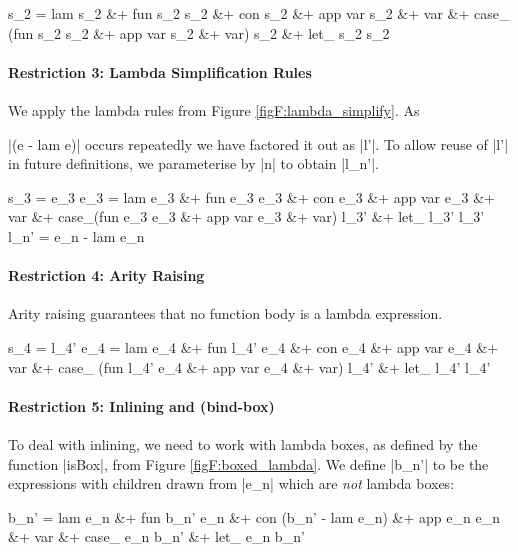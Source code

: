 \ignore\begin{code}
s_2  =  lam s_2 &+ fun s_2 s_2 &+ con s_2 &+ app var s_2 &+ var &+
        case_ (fun s_2 s_2 &+ app var s_2 &+ var) s_2 &+ let_ s_2 s_2
\end{code}

\paragraph{Restriction 3: Lambda Simplification Rules}
We apply the lambda rules from Figure \ref{figF:lambda_simplify}. As \ignore|(e - lam e)| occurs repeatedly we have factored it out as |l'|. To allow reuse of |l'| in future definitions, we parameterise by |n| to obtain |l_n'|.

\ignore\begin{code}
s_3   =  e_3
e_3   =  lam e_3 &+ fun e_3 e_3 &+ con e_3 &+ app var e_3 &+ var &+
         case_(fun e_3 e_3 &+ app var e_3 &+ var) l_3' &+ let_ l_3' l_3'
l_n'  =  e_n - lam e_n
\end{code}

\paragraph{Restriction 4: Arity Raising}
Arity raising guarantees that no function body is a lambda expression.

\ignore\begin{code}
s_4   =  l_4'
e_4   =  lam e_4 &+ fun l_4' e_4 &+ con e_4 &+ app var e_4 &+ var &+
         case_ (fun l_4' e_4 &+ app var e_4 &+ var) l_4' &+ let_ l_4' l_4'
\end{code}

\paragraph{Restriction 5: Inlining and (bind-box)}
To deal with inlining, we need to work with lambda boxes, as defined by the function |isBox|, from Figure \ref{figF:boxed_lambda}. We define |b_n'| to be the expressions with children drawn from |e_n| which are \textit{not} lambda boxes:

\ignore\begin{code}
b_n'  =  lam e_n &+ fun b_n' e_n &+ con (b_n' - lam e_n) &+ app e_n e_n &+ var &+
         case_ e_n b_n' &+ let_ e_n b_n'
\end{code}

